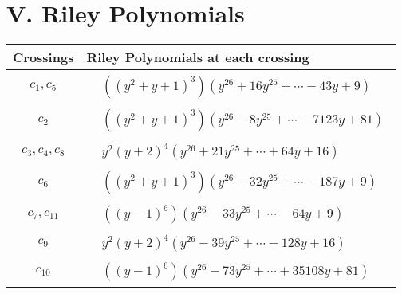 \documentclass[1p]{elsarticle_modified}
\theoremstyle{definition}
\begin{document}
\centering \section*{ V. Riley Polynomials}
\begin{tabular}{m{50pt}|m{274pt}}
Crossings & \hspace{64pt}Riley Polynomials at each crossing \\
\hline $$\begin{aligned}c_{1},c_{5}\end{aligned}$$&$\begin{aligned}
&((y^2+y+1)^3)(y^{26}+16 y^{25}+\cdots-43 y+9)
\end{aligned}$\\
\hline $$\begin{aligned}c_{2}\end{aligned}$$&$\begin{aligned}
&((y^2+y+1)^3)(y^{26}-8 y^{25}+\cdots-7123 y+81)
\end{aligned}$\\
\hline $$\begin{aligned}c_{3},c_{4},c_{8}\end{aligned}$$&$\begin{aligned}
&y^2(y+2)^4(y^{26}+21 y^{25}+\cdots+64 y+16)
\end{aligned}$\\
\hline $$\begin{aligned}c_{6}\end{aligned}$$&$\begin{aligned}
&((y^2+y+1)^3)(y^{26}-32 y^{25}+\cdots-187 y+9)
\end{aligned}$\\
\hline $$\begin{aligned}c_{7},c_{11}\end{aligned}$$&$\begin{aligned}
&((y-1)^6)(y^{26}-33 y^{25}+\cdots-64 y+9)
\end{aligned}$\\
\hline $$\begin{aligned}c_{9}\end{aligned}$$&$\begin{aligned}
&y^2(y+2)^4(y^{26}-39 y^{25}+\cdots-128 y+16)
\end{aligned}$\\
\hline $$\begin{aligned}c_{10}\end{aligned}$$&$\begin{aligned}
&((y-1)^6)(y^{26}-73 y^{25}+\cdots+35108 y+81)
\end{aligned}$\\
\hline
\end{tabular}
\vskip 2pc
\end{document}
